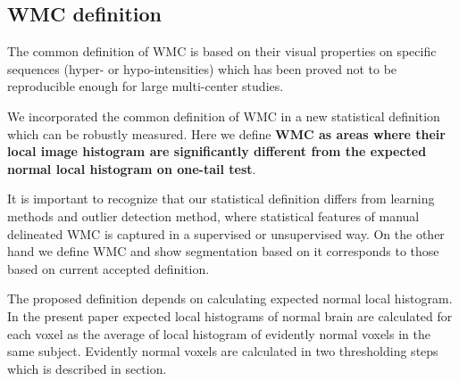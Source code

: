 \subsection{WMC definition}
The common definition of WMC is based on their visual properties on specific sequences (hyper- or hypo-intensities) which has been proved not to be reproducible enough for large multi-center studies. 
\par
We incorporated the common definition of WMC in a new statistical definition which can be robustly measured. Here we  define \textbf{WMC as areas where their local image histogram are significantly different from the expected normal local histogram on one-tail test}.
\par
It is important to recognize that our statistical definition differs from learning methods and outlier detection method, where statistical features of manual delineated WMC is captured in a supervised or unsupervised way.
On the other hand we define WMC and show segmentation based on it corresponds to those based on current accepted definition.
\par
The proposed definition depends on calculating expected normal local histogram. In the present paper expected local histograms of normal brain are calculated for each voxel as the average of local histogram of evidently normal voxels in the same subject. Evidently normal voxels are calculated in two thresholding steps which is described in section.